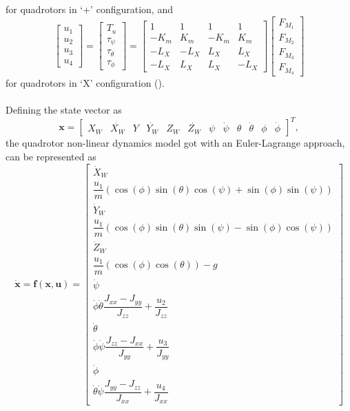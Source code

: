 for quadrotors in `+' configuration, and
\begin{equation}
\begin{bmatrix}
u_1 \\[5pt] u_2 \\[5pt] u_3 \\[5pt] u_4
\end{bmatrix}	 = \begin{bmatrix}
	T_u\\[5pt]
	\tau_{\psi}\\[5pt]
	\tau_{\theta}\\[5pt]
	\tau_{\phi}
	\end{bmatrix} = \begin{bmatrix}
	1 & 1 & 1 & 1 \\[5pt]
	-K_{m} & K_{m} & -K_{m} & K_{m}\\[5pt]
	-L_{X} & -L_{X} & L_{X} & L_{X}\\[5pt]
	-L_{X} & L_{X} & L_{X} & -L_{X}
							\end{bmatrix}
\begin{bmatrix}
F_{M_1}\\[5pt]
F_{M_2}\\[5pt]
F_{M_3}\\[5pt]
F_{M_4}
\end{bmatrix}
\end{equation}
for quadrotors in `X' configuration (\cite{Emam2016, Badr2016}).
\\\\
Defining the state vector as
\setcounter{MaxMatrixCols}{20}
\begin{equation}
\mathbf{x} = \begin{bmatrix}
X_W & \dot{X_W} & Y & \dot{Y_W} & Z_W & \dot{Z_W} & \psi & \dot{\psi} & \theta & \dot{\theta} & \phi & \dot{\phi}
\end{bmatrix}^{T},
\end{equation} 
the quadrotor non-linear dynamics model got with an Euler-Lagrange approach, can be represented as
\begin{equation}
\mathbf{\dot{x}} = \mathbf{f(x,u)} = \begin{bmatrix}
\dot{X}_W \\[5pt]
\dfrac{u_{1}}{m}(\cos(\phi)\sin(\theta)\cos(\psi) + \sin(\phi)\sin(\psi)) \\[5pt]
\dot{Y}_W \\[5pt]
\dfrac{u_{1}}{m}(\cos(\phi)\sin(\theta)\sin(\psi) - \sin(\phi)\cos(\psi)) \\[5pt]
\dot{Z}_W \\[5pt]
\dfrac{u_{1}}{m}(\cos(\phi)\cos(\theta)) - g \\[5pt]
\dot{\psi} \\[5pt]
\dot{\phi}\dot{\theta} \dfrac{J_{xx}-J_{yy}}{J_{zz}} + \dfrac{u_{2}}{J_{zz}} \\[5pt]
\dot{\theta} \\[5pt]
\dot{\phi} \dot{\psi}\dfrac{J_{zz}-J_{xx}}{J_{yy}} + \dfrac{u_{3}}{J_{yy}} \\[5pt]
\dot{\phi} \\[5pt]
\dot{\theta}\dot{\psi}\dfrac{J_{yy}-J_{zz}}{J_{xx}} + \dfrac{u_{4}}{J_{xx}}
\end{bmatrix}
\end{equation}

